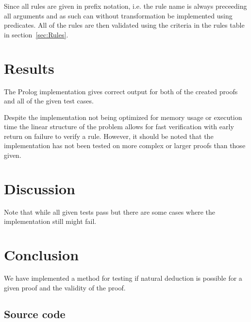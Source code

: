 \documentclass[a4paper,11pt]{article}
\begin{document}
Since all rules are given in prefix notation, i.e. the rule name is always preceeding all arguments and as such can without transformation be implemented using predicates. All of the rules are then validated using the criteria in the rules table in section~\ref{sec:Rules}.
\section{Results}
The Prolog implementation gives correct output for both of the created proofs and all of the given test cases.

Despite the implementation not being optimized for memory usage or execution time the linear structure of the problem allows for fast verification with early return on failure to verify a rule. However, it should be noted that the implementation has not been tested on more complex or larger proofs than those given.
\section{Discussion}
Note that while all given tests pass but there are some cases where the implementation still might fail. 
\section{Conclusion}
We have implemented a method for testing if natural deduction is possible for a given proof and the validity of the proof.
\newpage
\begin{appendices}
\section{Source code}

\end{appendices}
\end{document}
